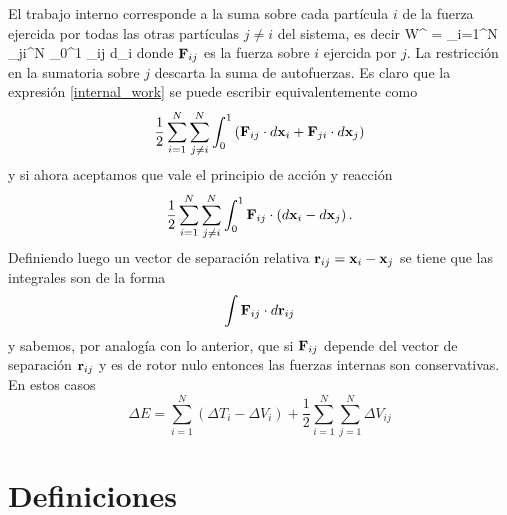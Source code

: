 \documentclass[10pt,oneside]{CBFT_book}
\begin{document}
El trabajo interno corresponde a la suma sobre cada partícula $i$ de la fuerza ejercida por todas las otras partículas 
$j \neq i$ del sistema, es decir
\be
	W^{} = \sum_{i=1}^N \sum_{j\neq i}^N \int_0^1 _{ij} \cdot d_i
	\label{internal_work}
\ee
donde $\vb{F}_{ij} $ es la fuerza sobre $i$ ejercida por $j$. La restricción en la sumatoria sobre $j$ descarta la suma 
de autofuerzas. Es claro que la expresión \eqref{internal_work} se puede escribir equivalentemente como
\[
	\frac{1}{2} \sum_{i=1}^N \sum_{j\neq i}^N \int_0^1 
	\left( \vb{F}_{ij} \cdot d\vb{x}_i + \vb{F}_{ji} \cdot d\vb{x}_j \right) 
\]
%
y si ahora aceptamos que vale el principio de acción y reacción
\[
	\frac{1}{2} \sum_{i=1}^N \sum_{j\neq i}^N \int_0^1 
	\vb{F}_{ij} \cdot \left(d\vb{x}_i - d\vb{x}_j \right) .
\]
Definiendo luego un vector de separación relativa $ \vb{r}_{ij} = \vb{x}_i - \vb{x}_j $ se tiene que las integrales son 
de la forma 
\[
	\int \vb{F}_{ij} \cdot d\vb{r}_{ij}
\]
y sabemos, por analogía con lo anterior, que si $\vb{F}_{ij}$ depende del vector de separación $ \vb{r}_{ij} $ y es de 
rotor nulo entonces las fuerzas internas son conservativas.
En estos casos
\[
	\Delta E = \sum_{i=1}^N ( \Delta T_i - \Delta V_i ) + \frac{1}{2} \sum_{i=1}^N \sum_{j=1}^N \Delta V_{ij}
\]


\section{Definiciones}
\end{document}
